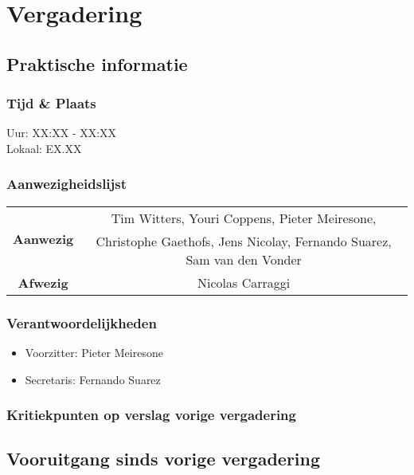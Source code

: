\section{Vergadering \MeetingDate}
\subsection{Praktische informatie}
\subsubsection{Tijd \& Plaats}
Uur: XX:XX - XX:XX
\\
Lokaal: EX.XX
\subsubsection{Aanwezigheidslijst}
\begin{table}[htbp]
	\centering
	\begin{tabular}{c|c}
		\multirow{2}{*}{\textbf{Aanwezig}} & Tim Witters, Youri Coppens, Pieter Meiresone, \\
		& Christophe Gaethofs, Jens Nicolay, Fernando Suarez, Sam van den Vonder \\
		\hline
		\textbf{Afwezig} & Nicolas Carraggi \\
	\end{tabular}
\end{table}

\subsubsection{Verantwoordelijkheden}
\begin{itemize}
	\item Voorzitter: Pieter Meiresone
	\item Secretaris: Fernando Suarez
\end{itemize}

\subsubsection{Kritiekpunten op verslag vorige vergadering}

\subsection{Vooruitgang sinds vorige vergadering}

